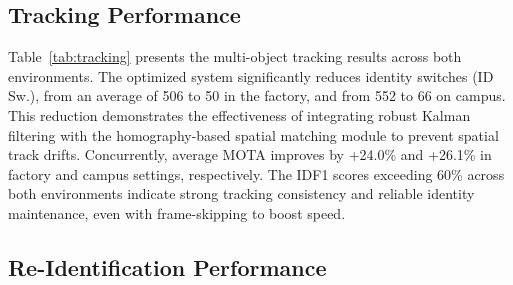 \documentclass[conference]{IEEEtran}
\begin{document}
\begin{table}[t]
\caption{Per-Frame Processing Latency}
\label{tab:latency}
\centering
\renewcommand{\arraystretch}{1.1}
\end{table}


\subsection{Tracking Performance}
\label{subsec:tracking-results}

Table~\ref{tab:tracking} presents the multi-object tracking results across both environments. The optimized system significantly reduces identity switches (ID Sw.), from an average of 506 to 50 in the factory, and from 552 to 66 on campus. This reduction demonstrates the effectiveness of integrating robust Kalman filtering with the homography-based spatial matching module to prevent spatial track drifts. Concurrently, average MOTA improves by +24.0\% and +26.1\% in factory and campus settings, respectively. The IDF1 scores exceeding 60\% across both environments indicate strong tracking consistency and reliable identity maintenance, even with frame-skipping to boost speed.

\subsection{Re-Identification Performance}
\label{subsec:reid-results}
\end{document}
